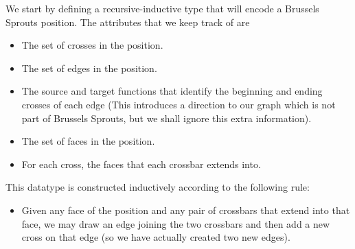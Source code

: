 \documentclass{article}
\newcommand{\D}{\AgdaDatatype}
\begin{document}
  We start by defining a recursive-inductive type \D{bsPlay} that will encode a Brussels Sprouts position.  The attributes that we keep track of are
  \begin{itemize}
    \item The set of crosses in the position.
    \item The set of edges in the position.
    \item The source and target functions that identify the beginning and ending crosses of each edge (This introduces a direction to our graph which is not part of Brussels Sprouts, but we shall ignore this extra information).
    \item The set of faces in the position.
    \item For each cross, the faces that each crossbar extends into.
  \end{itemize}

  This datatype is constructed inductively according to the following rule:
  \begin{itemize}
    \item Given any face of the position and any pair of crossbars that extend into that face, we may draw an edge joining the two crossbars and then add a new cross on that edge (so we have actually created two new edges).
  \end{itemize}
\end{document}
